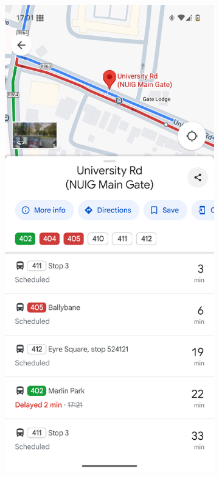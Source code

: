 \documentclass[a4paper,11pt]{report}
\begin{document}
\begin{figure}[H]
    \centering
    \begin{subfigure}[c]{0.2\textwidth}
        \centering
        \includegraphics[width=\textwidth]{../PDD/images/gmobile.png}

\end{subfigure}
\end{figure}
\end{document}
